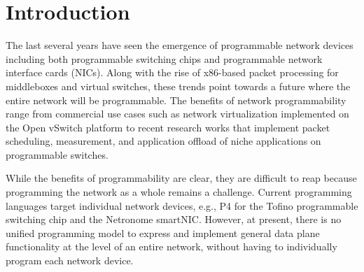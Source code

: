 \vspace{-0.1in}
\section{Introduction}
The last several years have seen the emergence of programmable network devices
including both programmable switching chips and programmable network interface
cards (NICs). Along with the rise of x86-based packet processing for
middleboxes and virtual switches, these trends point towards a future where the
entire network will be programmable. The benefits of network programmability
range from commercial use cases such as network virtualization implemented on
the Open vSwitch platform to recent research works that
implement packet scheduling, measurement, and application offload of niche
applications on programmable switches.

While the benefits of programmability are clear, they are difficult to reap
because programming the network as a whole remains a challenge. Current
programming languages target individual network devices, e.g., P4 for the
Tofino programmable switching chip and the Netronome smartNIC. However,
at present, there is no unified programming model to express and implement
general data plane functionality at the level of an entire network, without
having to individually program each network device.

